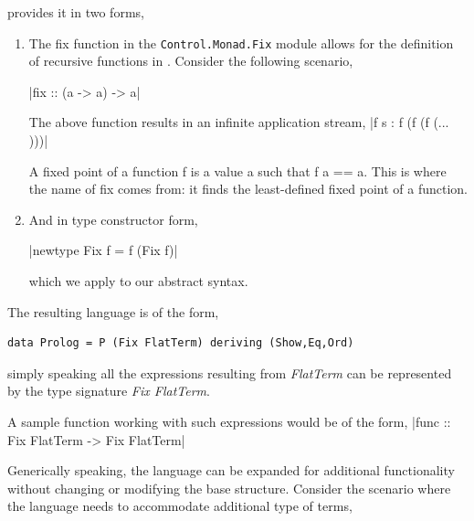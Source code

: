 \documentclass[thesis-solanki.tex]{subfiles}
\begin{document}
 provides it in two forms,
\begin{enumerate}

\item The fix function in the \texttt{Control.Monad.Fix} module allows for the definition of recursive functions in . Consider the following scenario,

|fix :: (a -> a) -> a|

The above function results in an infinite application stream,
|f s : f (f (f (... )))|

A fixed point of a function f is a value a such that f a == a. This is where the name of fix comes from: it finds the least-defined fixed 
point of a function.

\item And in type constructor form,

|newtype Fix f = f (Fix f)| 

which we apply to our abstract syntax.

\end{enumerate}


The resulting language is of the form,
\begin{verbatim}
data Prolog = P (Fix FlatTerm) deriving (Show,Eq,Ord)
\end{verbatim}

simply speaking all the expressions resulting from \textit{FlatTerm} can be represented  by the type signature \textit{Fix FlatTerm}. 

A sample function working with such expressions would be of the form,
|func :: Fix FlatTerm -> Fix FlatTerm|


Generically speaking, the language can be expanded for additional functionality without changing or modifying the base structure. Consider
the scenario where the language needs to accommodate additional type of terms,
\end{document}
